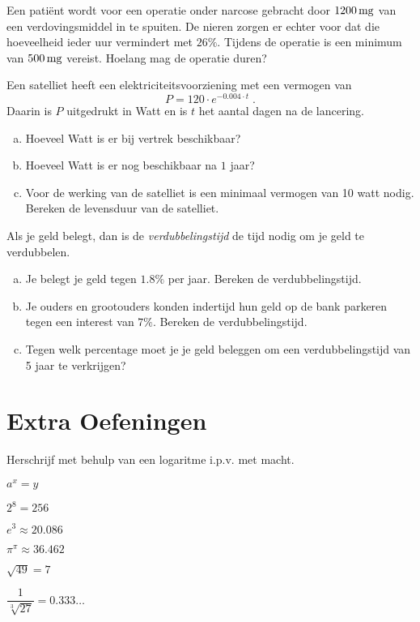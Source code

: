 \documentclass[12pt,twoside,a4paper]{article}
\begin{document}
\begin{oefening}
Een patiënt wordt voor een operatie onder narcose gebracht door $1200 \mg$ van een verdovingsmiddel in te spuiten. De nieren zorgen er echter voor dat die hoeveelheid ieder uur vermindert met $26 \%$. Tijdens de operatie is een minimum van $500 \mg$ vereist. Hoelang mag de operatie duren?
\end{oefening}

\begin{oefening}
Een satelliet heeft een elektriciteitsvoorziening met een vermogen van
$$P=120\cdot e^{-0.004\cdot t}\;.$$
Daarin is $P$ uitgedrukt in Watt en is $t$ het aantal dagen na de lancering.
\begin{enumerate}[(a)]
  \item Hoeveel Watt is er bij vertrek beschikbaar?
  \item Hoeveel Watt is er nog beschikbaar na $1$ jaar?
  \item Voor de werking van de satelliet is een minimaal vermogen van 10 watt nodig. Bereken de levensduur van de satelliet.
\end{enumerate}
\end{oefening}

\begin{oefening}
Als je geld belegt, dan is de {\em verdubbelingstijd} de tijd nodig om je geld te verdubbelen.
\begin{enumerate}[(a)]
  \item Je belegt je geld tegen $1.8 \%$ per jaar. Bereken de verdubbelingstijd.
  \item Je ouders en grootouders konden indertijd hun geld op de bank parkeren tegen een interest van $7 \%$. Bereken de verdubbelingstijd.
  \item Tegen welk percentage moet je je geld beleggen om een verdubbelingstijd van 5 jaar te verkrijgen?
\end{enumerate}
\end{oefening}

\cleardoublepage
\section{Extra Oefeningen}

\begin{oefening}
Herschrijf met behulp van een logaritme i.p.v. met macht.
\begin{exlist}{3}
  \item $a^x=y$
  \item $2^8=256$
  \item $e^3\approx20.086$
  \item $\pi^\pi\approx36.462$
  \item $\sqrt{49}=7$
  \item $\dfrac{1}{\sqrt[3]{27}}=0.333\ldots$
\end{exlist}
\end{oefening}
\end{document}
